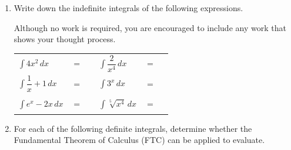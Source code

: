 \documentclass[11pt]{article}
\begin{document}
\begin{enumerate}
\begin{enumerate}
\end{enumerate}

\newpage


\item Write down the indefinite integrals of the following expressions. 

Although no work is required, you are encouraged to include any work that shows your thought process. 


\begin{center}
        \begin{tabular}{l c r l c r}
            $\displaystyle\int 4x^2\,dx$ & $=$ & \rule[-8pt]{1.5in}{0.4pt} &
            \vspace{2in}
            $\displaystyle\int \dfrac{2}{x^4} \,dx$ & $=$ & \rule[-8pt]{1.5in}{0.4pt}\\[1in]
            $\displaystyle\int \dfrac{1}{x}+1\,dx$ & $=$ & \rule[-8pt]{1.5in}{0.4pt}&
            \vspace{2in}
            $\displaystyle\int 3^x\,dx$ & $=$ & \rule[-8pt]{1.5in}{0.4pt}\\[1in]
            $\displaystyle\int e^x-2x \,dx$ & $=$ & \rule[-8pt]{1.5in}{0.4pt} & 
            $\displaystyle\int \sqrt[5]{x^4} \,dx$ & $=$ & \rule[-8pt]{1.5in}{0.4pt}\\[0.3in]
        \end{tabular}
\end{center}


\newpage


\item For each of the following definite integrals, determine whether the Fundamental Theorem of Calculus (FTC) can be applied to evaluate. 


\end{enumerate}
\end{document}
